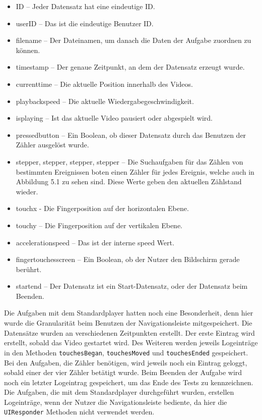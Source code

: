\documentclass[11pt,a4paper]{report}
\begin{document}
\begin{itemize}
\item ID – Jeder Datensatz hat eine eindeutige ID.
\item userID – Das ist die eindeutige Benutzer ID.
\item filename – Der Dateinamen, um danach die Daten der Aufgabe zuordnen zu können.
\item timestamp – Der genaue Zeitpunkt, an dem der Datensatz erzeugt wurde.
\item currenttime – Die aktuelle Position innerhalb des Videos.
\item playbackspeed – Die aktuelle Wiedergabegeschwindigkeit.
\item isplaying – Ist das aktuelle Video pausiert oder abgespielt wird.
\item pressed\textunderscore button – Ein Boolean, ob dieser Datensatz durch das Benutzen der Zähler ausgelöst wurde.
\item stepper, stepper, stepper, stepper – Die Suchaufgaben für das Zählen von bestimmten Ereignissen boten einen Zähler für jedes Ereignis, welche auch in Abbildung 5.1 zu sehen sind. Diese Werte geben den aktuellen Zählstand wieder.
\item touch\textunderscore x - Die Fingerposition auf der horizontalen Ebene.
\item touch\textunderscore y – Die Fingerposition auf der vertikalen Ebene.
\item acceleration\textunderscore speed – Das ist der interne speed Wert.
\item finger\textunderscore touches\textunderscore screen – Ein Boolean, ob der Nutzer den Bildschirm gerade berührt.
\item start\textunderscore end – Der Datensatz ist ein Start-Datensatz, oder der Datensatz beim Beenden.
\end{itemize}
Die Aufgaben mit dem Standardplayer hatten noch eine Besonderheit, denn hier wurde die Granularität beim Benutzen der Navigationsleiste mitgespeichert. Die Datensätze wurden an verschiedenen Zeitpunkten erstellt. Der erste Eintrag wird erstellt, sobald das Video gestartet wird. Des Weiteren werden jeweils Logeinträge in den Methoden \texttt{touchesBegan}, \texttt{touchesMoved} und \texttt{touchesEnded} gespeichert. Bei den Aufgaben, die Zähler benötigen, wird jeweils noch ein Eintrag geloggt, sobald einer der vier Zähler betätigt wurde. Beim Beenden der Aufgabe wird noch ein letzter Logeintrag gespeichert, um das Ende des Tests zu kennzeichnen. Die Aufgaben, die mit dem Standardplayer durchgeführt wurden, erstellen Logeinträge, wenn der Nutzer die Navigationsleiste bediente, da hier die \texttt{UIResponder} Methoden nicht verwendet werden.
\end{document}
